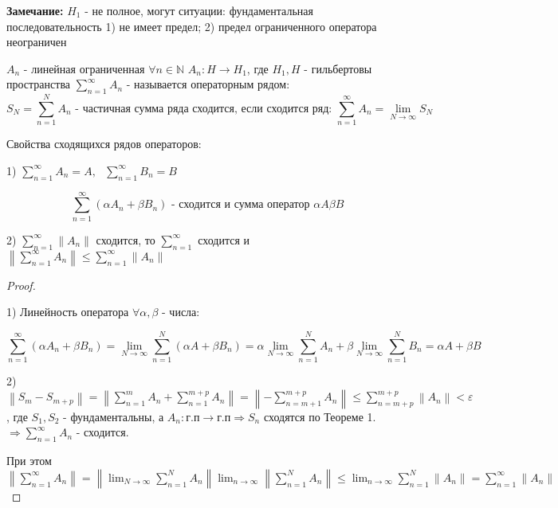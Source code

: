 \documentclass[12pt, a4paper]{report}
\begin{document}
\begin{flushleft}   
    \textbf{Замечание: } \( H_1  \)  - не полное, могут ситуации: фундаментальная последовательность 1) не имеет предел; 2) предел ограниченного оператора неограничен
\end{flushleft} 

\begin{definition}
    \( A_n \) - линейная ограниченная \( \forall  n \in \mathbb{N} \) \( A_n : H \to  H_1 \), где  \( H_1, H   \)  - гильбертовы пространства \( \displaystyle  \sum_{n =1} ^{\infty  }A_n  \)  - называется операторным рядом: 
    \[ S_N = \sum_{n =1}^N A_n \text{ - частичная сумма ряда сходится, если сходится ряд: } \sum_{n =1}^{ \infty  } A_n = \lim_{N \to \infty}  S_N    \] 
\end{definition}

Свойства сходящихся рядов операторов: 

1) \( \displaystyle \sum_{n =1}^{\infty  } A_n = A , \text{ }  \sum_{n =1}^{ \infty  } B_n =B   \) 

\[ \sum_{n =1}^{ \infty  } (\alpha A_n + \beta B_n ) \text{ - сходится и сумма оператор } \alpha A \beta B   \] 

2) \(\displaystyle  \sum_{n =1} ^{\infty  } \left\lVert A_n \right\rVert   \) сходится, то \( \displaystyle  \sum_{n =1}^{ \infty   }   \) сходится  и \( \displaystyle  \left\lVert  \sum_{ n =1} ^{ \infty  } A_n    \right\rVert \le \sum_{n =1}^{\infty  }\left\lVert A_n \right\rVert  \) 

\begin{proof} \(  \) 

    1) Линейность оператора \( \forall  \alpha , \beta \) - числа: 

    \[ \sum_{n =1}^{ \infty  } (\alpha A_n + \beta B_n ) = \lim_{N  \to \infty} \sum_{n =1}^{ N }  (\alpha A+ \beta B_n ) = \alpha \lim_{N  \to \infty} \sum_{n =1}^{N } A_n + \beta \lim_{N  \to \infty} \sum_{n =1}^{N } B_n = \alpha A + \beta B    \] 

    2) \(\displaystyle  \left\lVert  S_m - S_{m + p }  \right\rVert = \left\lVert \sum_{n =1}^{m }  A_n + \sum_{n =1}^{ m+ p} A_n   \right\rVert  = \left\lVert - \sum_{n =m +1 } ^{ m + p }  A_n  \right\rVert \le \sum_{n =m+p } ^{m+ p }  \left\lVert A_n \right\rVert < \varepsilon\) 
    , где \( S_1, S_2 \) - фундаментальны, а \( A_n : \text{г.п} \to  \text{г.п}  \Rightarrow S_n\) сходятся по Теореме 1. \(  \Rightarrow \displaystyle  \sum_{n =1}^{ \infty } A_n \) - сходится. 

    При этом \(\displaystyle  \left\lVert \sum_{n =1}^{\infty  }   A_n\right\rVert = \left\lVert \lim_{N  \to \infty}  \sum_{n =1}^{N } A_n  \right\rVert  \lim_{n       \to \infty} \left\lVert \sum_{n =1}^{N } A_n   \right\rVert \le \lim_{n  \to \infty} \sum_{n =1}^N \left\lVert A_n \right\rVert = \sum_{n =1}^{\infty  } \left\lVert A_n \right\rVert   \) 

\end{proof}
\end{document}

